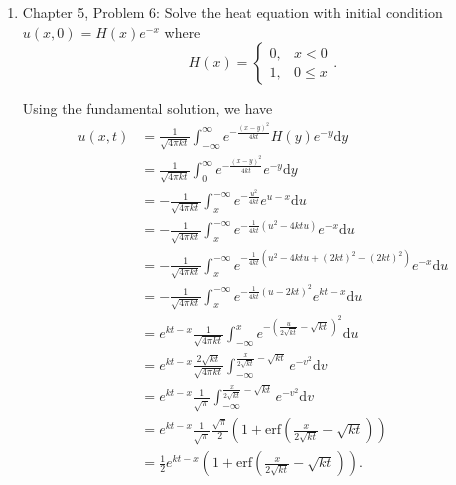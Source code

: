 \documentclass[a4paper,12pt]{article}
\newcommand{\erf}{\mathrm{erf}}
\newcommand{\dd}[1]{\mathrm{d}#1}
\begin{document}
\begin{enumerate}[label = \arabic*.]
    \item Chapter 5, Problem 6: Solve the heat equation with initial condition $ u(x,0) = H(x)e^{-x} $ where
    \[
    	H(x) = \begin{cases}
    		0, & x < 0 \\
    		1, & 0 \leq x
    	\end{cases}.
    \]
    
    Using the fundamental solution, we have
    \begin{align*}
    	u(x,t) &= \frac{1}{\sqrt{4 \pi k t}} \int_{-\infty}^{\infty}e^{-\frac{(x - y)^2}{4 k t}} H(y)e^{-y} \dd y \\
    	&= \frac{1}{\sqrt{4 \pi k t}} \int_{0}^{\infty}e^{-\frac{(x - y)^2}{4 k t}}e^{-y} \dd y \\
    	&= -\frac{1}{\sqrt{4 \pi k t}} \int_{x}^{-\infty}e^{-\frac{u^2}{4 k t}}e^{u - x} \dd u \\
    	&= -\frac{1}{\sqrt{4 \pi k t}} \int_{x}^{-\infty}e^{-\frac{1}{4 k t}(u^2 - 4ktu)}e^{- x} \dd u \\
    	&= -\frac{1}{\sqrt{4 \pi k t}} \int_{x}^{-\infty}e^{-\frac{1}{4 k t}(u^2 - 4ktu + (2kt)^2 - (2kt)^2)}e^{- x} \dd u \\
    	&= -\frac{1}{\sqrt{4 \pi k t}} \int_{x}^{-\infty}e^{-\frac{1}{4 k t}(u - 2kt)^2}e^{kt - x} \dd u \\
    	&= e^{kt - x}\frac{1}{\sqrt{4 \pi k t}} \int_{-\infty}^{x}e^{-\left(\frac{u}{2\sqrt{kt}} - \sqrt{kt}\right)^2} \dd u \\
    	&= e^{kt - x}\frac{2 \sqrt{k t}}{\sqrt{4 \pi k t}} \int_{-\infty}^{\frac{x}{2\sqrt{kt}} - \sqrt{kt}}e^{-v^2} \dd v \\
    	&= e^{kt - x}\frac{1}{\sqrt{\pi}} \int_{-\infty}^{\frac{x}{2\sqrt{kt}} - \sqrt{kt}}e^{-v^2} \dd v \\
    	&= e^{kt - x}\frac{1}{\sqrt{\pi}} \frac{\sqrt{\pi}}{2} \left(1 + \erf\left(\frac{x}{2\sqrt{kt}} - \sqrt{kt}\right)\right) \\
    	&= \frac{1}{2} e^{kt - x} \left(1 + \erf\left(\frac{x}{2\sqrt{kt}} - \sqrt{kt}\right)\right).
    \end{align*}
\end{enumerate}
\end{document}
